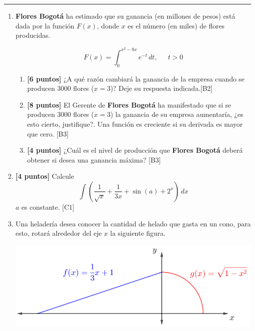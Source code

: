 \documentclass[10pt]{exam}
\begin{document}
\addpoints

\noindent
\rule[2ex]{\textwidth}{2pt}


\begin{enumerate}
\normalsize
\setlength{\columnsep}{10mm}

    \item  \textbf{Flores Bogotá}
ha estimado que su ganancia (en millones de pesos) está dada por la función $F(x)$, donde $x$ es el número  (en miles) de flores producidas.



$$F(x)=\int_0^{x^2-8x}e^{-t}\, dt,\,\,\,\,\,\,\,\,\,t>0$$
\begin{enumerate}

    \item \textbf{[6 puntos]} ¿A qué razón cambiará la ganancia de la empresa cuando se producen 3000 flores ($x=3$)?  Deje su respuesta indicada.\hfill{[B2]} 
    \item \textbf{[8 puntos]} El Gerente de \textbf{Flores Bogotá}  ha manifestado que si se producen 3000 flores ($x=3$) la ganancia de su empresa aumentaría, ¿es esto cierto,  justifique?.
    Una función es creciente si su derivada es mayor que cero. \hfill{[B3]} 
    \item \textbf{[4 puntos]} ¿Cuál es el nivel de producción que \textbf{Flores Bogotá} deberá obtener si desea una ganancia máxima?  \hfill{[B3]}
    \end{enumerate}




   \item \textbf{[4 puntos]} Calcule $$\int \left(\dfrac{1}{\sqrt{x}}+\dfrac{1}{3x}+\sin{(a)}+2^x \right)\, dx$$ 
$a$ es constante. \hfill{[C1]}
\item Una heladería desea conocer la cantidad de helado que gasta en un cono, para esto, rotará alrededor del eje $x$ la siguiente figura.

\begin{center}
    \includegraphics[scale=1.5]{cono.png}
\end{center}


\end{enumerate}
\end{document}
